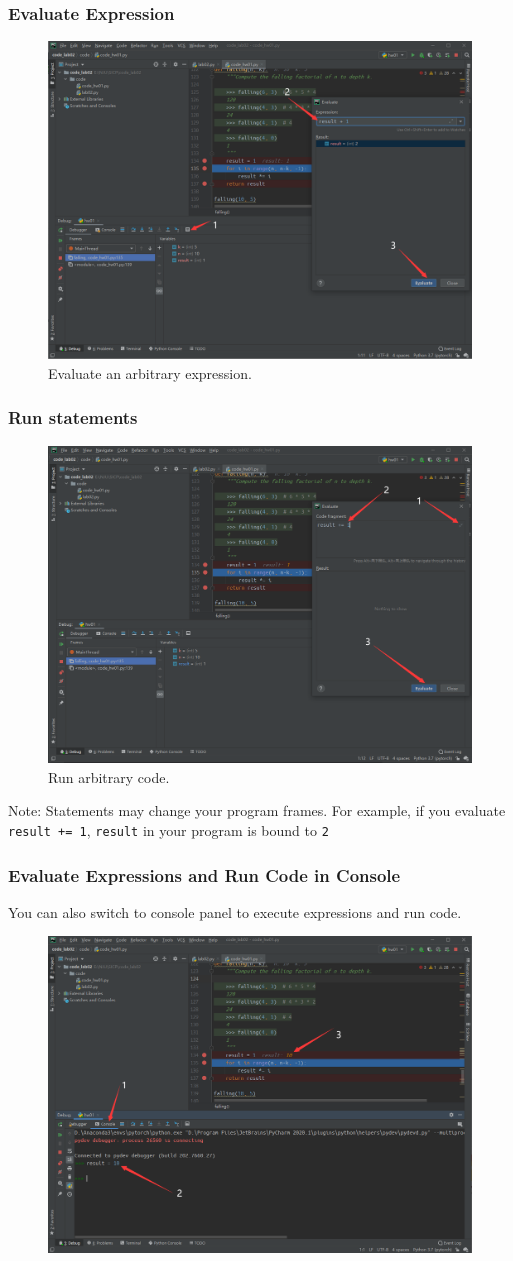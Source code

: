 \documentclass[aspectratio=169]{beamer}
\begin{document}
\begin{frame}
\frametitle{Evaluate Expression}
\begin{figure}
    \centering
    \includegraphics[width=0.5\linewidth]{./imgs/evaluate.png}
    \caption{Evaluate an arbitrary expression.}
    \label{fig:breakpoint}
\end{figure}
\vspace{-5mm}
\end{frame}


\begin{frame}
\frametitle{Run statements}
\vspace{-5mm}
\begin{figure}
    \centering
    \includegraphics[width=0.4\linewidth]{./imgs/evaluate_2.png}
    \caption{Run arbitrary code.}
    \label{fig:breakpoint}
\end{figure}
\vspace{-5mm}
Note: Statements may change your program frames. For example, if you evaluate \texttt{result += 1}, \texttt{result} in your program is bound to \texttt{2}
\end{frame}

\begin{frame}
\frametitle{Evaluate Expressions and Run Code in Console}

You can also switch to console panel to execute expressions and run code.

\begin{figure}
    \centering
    \includegraphics[width=0.5\linewidth]{./imgs/console.png}
    \label{fig:breakpoint}
\end{figure}
\vspace{-5mm}
\end{frame}
\end{document}

